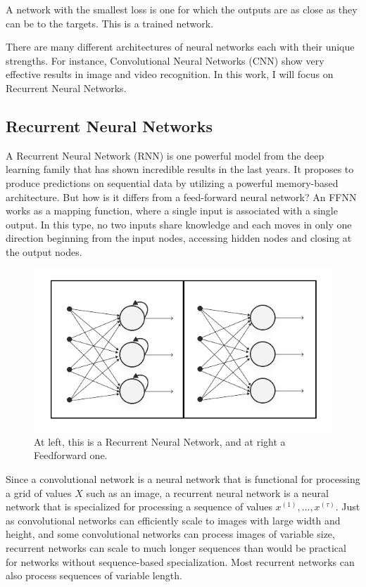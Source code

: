 A network with the smallest loss is one for which the outputs are as close as they can be to the targets.
This is a trained network.

There are many different architectures of neural networks each with their unique strengths.
For instance, Convolutional Neural Networks (CNN) show very effective results in image and video recognition.
In this work, I will focus on Recurrent Neural Networks.

\subsection{Recurrent Neural Networks}\label{subsec:recurrent-neural-networksrnn}

A Recurrent Neural Network (RNN) is one powerful model from the deep learning family that has
shown incredible results in the last years.
It proposes to produce predictions on sequential data by utilizing a powerful memory-based architecture.
But how is it differs from a feed-forward neural network?
An FFNN works as a mapping function, where a single input is associated with a single output.
In this type, no two inputs share knowledge and each moves in
only one direction beginning from the input nodes, accessing
hidden nodes and closing at the output nodes.

\begin{figure}[H]
    \centering
    \includegraphics[scale=0.6]{./images/background/rnn.png}
    \caption{At left, this is a Recurrent Neural Network, and at right a Feedforward one.}
    \label{fig:rnn}
\end{figure}

Since a convolutional network is a neural network that is functional for processing a grid of values $X$ such as an image,
a recurrent neural network is a neural network that is specialized for processing a sequence of
values $x^{(1)} , \ldots , x^{(\tau)}$.
Just as convolutional networks can efficiently scale to images with large width and height,
and some convolutional networks can process images of variable size, recurrent networks can scale to much longer sequences
than would be practical for networks without sequence-based specialization.
Most recurrent networks can also process sequences of variable length.

